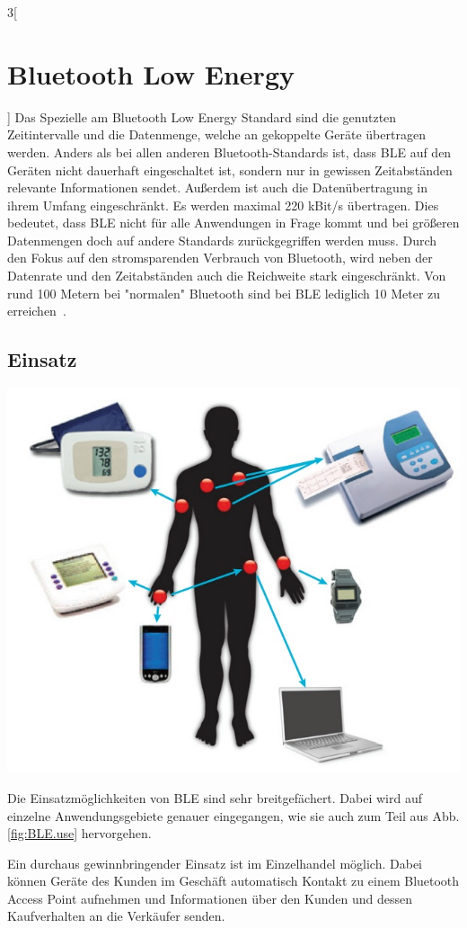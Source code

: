 \begin{multicols}{3}[\section{Bluetooth Low Energy}]
Das Spezielle am Bluetooth Low Energy Standard sind die genutzten Zeitintervalle und die Datenmenge, welche an gekoppelte Geräte übertragen werden. Anders als bei allen anderen Bluetooth-Standards ist, dass BLE auf den Geräten nicht dauerhaft eingeschaltet ist, sondern nur in gewissen Zeitabständen relevante Informationen sendet. Außerdem ist auch die Datenübertragung in ihrem Umfang eingeschränkt. Es werden maximal 220 kBit/s übertragen. Dies bedeutet, dass BLE nicht für alle Anwendungen in Frage kommt und bei größeren Datenmengen doch auf andere Standards zurückgegriffen werden muss. Durch den Fokus auf den stromsparenden Verbrauch von Bluetooth, wird neben der Datenrate und den Zeitabständen auch die Reichweite stark eingeschränkt. Von rund 100 Metern bei "normalen" Bluetooth sind bei BLE lediglich 10 Meter zu erreichen~\cite{BLE.1}.
\subsection*{Einsatz}
\begin{Figure}
\includegraphics[width=\linewidth]{Kapitel/BLE/Grafiken/BLE_Use}
\label{fig:BLE.use}
\end{Figure}
Die Einsatzmöglichkeiten von BLE sind sehr breitgefächert. Dabei wird auf einzelne Anwendungsgebiete genauer eingegangen, wie sie auch zum Teil aus Abb. \ref{fig:BLE.use} hervorgehen. 

Ein durchaus gewinnbringender Einsatz ist im Einzelhandel möglich. Dabei können Geräte des Kunden im Geschäft automatisch Kontakt zu einem Bluetooth Access Point aufnehmen und Informationen über den Kunden und dessen Kaufverhalten an die Verkäufer senden. 
\end{multicols}
